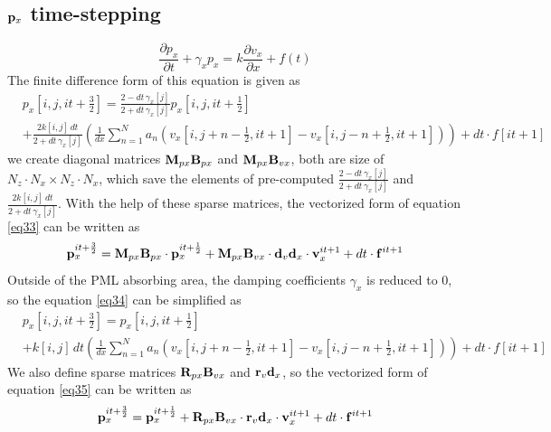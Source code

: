 \documentclass[revised,endfloat]{geophysics}
\begin{document}
\subsection{${\bf p}_x$ time-stepping}
\begin{equation}
\frac{\partial p_x}{\partial t} + \gamma_x p_x = k \frac{\partial v_x}{\partial x} + f(t) 
\label{eq32}
\end{equation}
The finite difference form of this equation is given as
\begin{equation}
\begin{split}
&p_x[i,j,it+\frac{3}{2}] = \frac{2-dt \, \gamma_x[j]}{2+dt \, \gamma_x[j]} p_x[i,j,it+\frac{1}{2}]  \\
&+ \frac{2k[i,j]\, dt}{2+dt \, \gamma_x[j]} \left(\frac{1}{dx} \sum_{n=1}^N  a_n \left(v_x[i,j+n-\frac{1}{2},it+1] - v_x[i,j-n+\frac{1}{2},it+1] \right) \right) + dt \cdot f[it+1] 
\end{split}
\label{eq33}
\end{equation}
we create diagonal matrices ${\bf M}_{px}{\bf B}_{px}$ and ${\bf M}_{px}{\bf B}_{vx}$, both are size of $N_z \cdot N_x \times N_z \cdot N_x$,  which save the elements of pre-computed $\frac{2- dt\, \gamma_x[j]}{2+ dt\, \gamma_x[j]}$ and $\frac{2k[i,j] \, dt}{2+ dt\, \gamma_x[j]}$. With the help of these sparse matrices, the vectorized form of equation \ref{eq33} can be written as
\begin{equation}
{\bf p}_x^{it+\frac{3}{2}} =  {\bf M}_{px}{\bf B}_{px} \cdot {\bf p}_x^{it+\frac{1}{2}} +  {\bf M}_{px}{\bf B}_{vx} \cdot {\bf d}_v{\bf d}_x \cdot {\bf v}_x^{it+1} + dt \cdot {\bf f}^{it+1}
\label{eq34}
\end{equation}
Outside of the PML absorbing area, the damping coefficients $\gamma_x$ is reduced to $0$, so the equation \ref{eq34} can be simplified as 
\begin{equation}
\begin{split}
&p_x[i,j,it+\frac{3}{2}] =  p_x[i,j,it+\frac{1}{2}]  \\
&+k[i,j]\, dt \left(\frac{1}{dx} \sum_{n=1}^N  a_n \left(v_x[i,j+n-\frac{1}{2},it+1] - v_x[i,j-n+\frac{1}{2},it+1] \right) \right) + dt \cdot f[it+1]
\end{split}
\label{eq35}
\end{equation}
We also define sparse matrices ${\bf R}_{px}{\bf B}_{vx}$ and ${\bf r}_{v}{\bf d}_{x}$, so the vectorized form of equation \ref{eq35} can be written as
\begin{equation}
{\bf p}_x^{it+\frac{3}{2}} =  {\bf p}_x^{it+\frac{1}{2}} +  {\bf R}_{px}{\bf B}_{vx} \cdot {\bf r}_v{\bf d}_x \cdot {\bf v}_x^{it+1} + dt \cdot {\bf f}^{it+1}
\label{eq36}
\end{equation}
\end{document}
